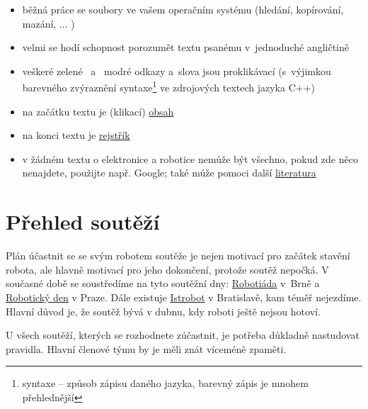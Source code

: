 \vspace*{1ex}

\begin{itemize} 
\item  běžná práce se soubory ve vašem operačním systému (hledání, kopírování, mazání, ... )
\item  velmi se hodí schopnost porozumět textu psanému v~jednoduché angličtině
\end{itemize}

\vspace*{1ex}

\begin{itemize} 
\item veškeré \color{mygreen} zelené\color{black} \ a~\color{blue} modré \color{black} 
 \color{black} odkazy a~slova jsou proklikávací (s~výjimkou barevného zvýraznění 
syntaxe\footnote{syntaxe -- způsob zápisu daného jazyka, barevný zápis je mnohem přehlednější} ve zdrojových textech jazyka C++)
\item na začátku textu je (klikací) \hyperref[obsah]{obsah} 
\item na konci textu je   \hyperref[rejstrik]{rejstřík} %
\item v žádném textu o elektronice a robotice nemůže být všechno, pokud zde něco nenajdete, použijte např. Google; také může pomoci další   \hyperref[literatura]{literatura}
\end{itemize}


\section{Přehled soutěží} \label{prehled_soutezi}   

Plán účastnit se se svým robotem soutěže je nejen motivací pro začátek stavění robota, ale hlavně motivací pro jeho dokončení, protože soutěž nepočká.  
V současné době se soustředíme na tyto soutěžní dny: \href{http://www.robotiada.cz/}{Robotiáda}  v~Brně a \href{http://robotickyden.cz}{Robotický den}  v Praze. 
Dále existuje \href{http://www.robotika.sk/contest/2018/index.php}{Istrobot} v Bratislavě, kam téměř nejezdíme. 
Hlavní důvod je, že soutěž bývá v dubnu, kdy roboti ještě nejsou hotoví. 

U všech soutěží, kterých se rozhodnete zúčastnit, je potřeba důkladně nastudovat pravidla. Hlavní členové týmu by je měli znát víceméně zpaměti. 

